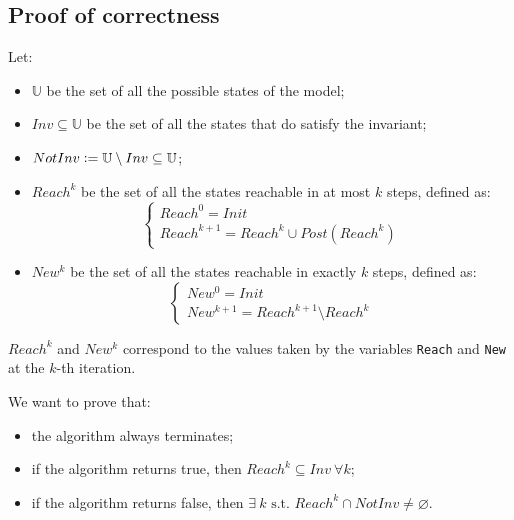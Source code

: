 \documentclass[12pt]{article}
\begin{document}
    \subsection{Proof of correctness}
    Let:
    \begin{itemize}
        \item $\mathbb U$ be the set of all the possible states of the model;
        \item $Inv \subseteq \mathbb U$ be the set of all the states that do satisfy the invariant;
        \item $NotInv \vcentcolon= \mathbb U \setminus Inv \subseteq \mathbb U$;
        \item $Reach^k$ be the set of all the states reachable in at most $k$ steps, defined as:
        $$
            \begin{cases}
                Reach^0 = Init \\
                Reach^{k + 1} = Reach^k \cup Post(Reach^k)
            \end{cases}
        $$
        \item $New^k$ be the set of all the states reachable in exactly $k$ steps, defined as:
        $$
            \begin{cases}
                New^0 = Init \\
                New^{k + 1} = Reach^{k+1} \setminus Reach^k
            \end{cases}
        $$
    \end{itemize}
    $Reach^k$ and $New^k$ correspond to the values taken by the variables \texttt{Reach} and \texttt{New} at the $k$-th iteration.

    We want to prove that:
    \begin{itemize}
        \item the algorithm always terminates;
        \item if the algorithm returns true, then $Reach^k \subseteq Inv\ \forall k$;
        \item if the algorithm returns false, then $\exists\ k \mbox{ s.t. } Reach^k \cap NotInv \neq \varnothing$.
    \end{itemize}

\end{document}
